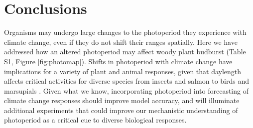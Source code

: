 \documentclass{article}
\begin{document}
\section*{Conclusions}
Organisms may undergo large changes to the photoperiod they experience with climate change, even if they do not shift their ranges spatially. Here we have addressed how an altered photoperiod may affect woody plant budburst (Table S1, Figure \ref{fig:photomap}). Shifts in photoperiod with climate change have implications for a variety of plant and animal responses, given that daylength affects critical activities for diverse species from insects \citep{bradshaw2006,linn1996} and salmon \citep{solbakken1994,taranger2003} to birds \citep{dawson2001} and marsupials \citep{mcallan2006,solbakken1994}. Given what we know, incorporating photoperiod into forecasting of climate change responses should improve model accuracy, and will illuminate additional experiments that could improve our mechanistic understanding of photoperiod as a critical cue to diverse biological responses. 
\end{document}
